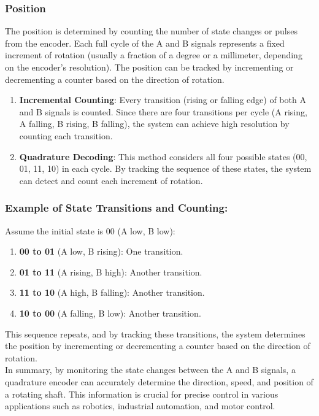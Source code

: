 \documentclass[main.tex]{subfiles}
\begin{document}
\subsubsection{Position}
The position is determined by counting the number of state changes or pulses from the encoder. Each full cycle of the A and B signals represents a fixed increment of rotation (usually a fraction of a degree or a millimeter, depending on the encoder's resolution). The position can be tracked by incrementing or decrementing a counter based on the direction of rotation.
    \begin{enumerate}
        \item \textbf{Incremental Counting}: Every transition (rising or falling edge) of both A and B signals is counted. Since there are four transitions per cycle (A rising, A falling, B rising, B falling), the system can achieve high resolution by counting each transition.
        \item \textbf{Quadrature Decoding}: This method considers all four possible states (00, 01, 11, 10) in each cycle. By tracking the sequence of these states, the system can detect and count each increment of rotation.
    \end{enumerate}

\subsubsection{Example of State Transitions and Counting:}

Assume the initial state is 00 (A low, B low):

\begin{enumerate}
    \item \textbf{00 to 01} (A low, B rising): One transition.
    \item \textbf{01 to 11} (A rising, B high): Another transition.
    \item \textbf{11 to 10} (A high, B falling): Another transition.
    \item \textbf{10 to 00} (A falling, B low): Another transition.
\end{enumerate}

\noindent This sequence repeats, and by tracking these transitions, the system determines the position by incrementing or decrementing a counter based on the direction of rotation.\\

\noindent In summary, by monitoring the state changes between the A and B signals, a quadrature encoder can accurately determine the direction, speed, and position of a rotating shaft. This information is crucial for precise control in various applications such as robotics, industrial automation, and motor control.
\end{document}
